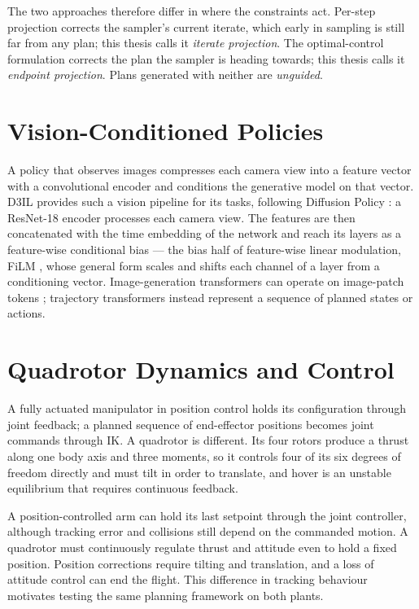 \documentclass[headsepline,footsepline,footinclude=false,oneside,fontsize=11pt,paper=a4,listof=totoc,bibliography=totoc]{scrbook}
\theoremstyle{definition}
\theoremstyle{plain}
\theoremstyle{remark}
\begin{document}
The two approaches therefore differ in where the constraints act. Per-step projection corrects the
sampler's current iterate, which early in sampling is still far from any plan; this thesis calls it
\emph{iterate projection}. The optimal-control formulation corrects the plan the sampler is heading
towards; this thesis calls it \emph{endpoint projection}. Plans generated with neither are \emph{unguided}.

\section{Vision-Conditioned Policies}\label{sec:bg:visual}

A policy that observes images compresses each camera view into a feature vector with a convolutional
encoder and conditions the generative model on that vector. D3IL \parencite{jia2024towards} provides
such a vision pipeline for its tasks, following Diffusion Policy \parencite{chi2023diffusion}: a
ResNet-18 encoder \parencite{he2016deep} processes each camera view. The features are then
concatenated with the time embedding of the network and reach its layers as a feature-wise
conditional bias --- the bias half of feature-wise linear modulation, \ac{FiLM}
\parencite[Sec.~3]{perez2017film}, whose general form scales and shifts each channel of a layer from
a conditioning vector. Image-generation transformers can operate on image-patch tokens \parencite{peebles2022dit};
trajectory transformers instead represent a sequence of planned states or actions.

\section{Quadrotor Dynamics and Control}\label{sec:bg:quadrotor}

A fully actuated manipulator in position control holds its configuration through joint feedback; a
planned sequence of end-effector positions becomes joint commands through \ac{IK}. A quadrotor is
different. Its four rotors produce a thrust along one body axis and three moments, so it controls four
of its six degrees of freedom directly and must tilt in order to translate, and hover is an unstable
equilibrium that requires continuous feedback.

A position-controlled arm can hold its last setpoint through the joint controller, although tracking
error and collisions still depend on the commanded motion. A quadrotor must continuously regulate
thrust and attitude even to hold a fixed position. Position corrections require tilting and translation,
and a loss of attitude control can end the flight. This difference in tracking behaviour motivates
testing the same planning framework on both plants.
\end{document}
